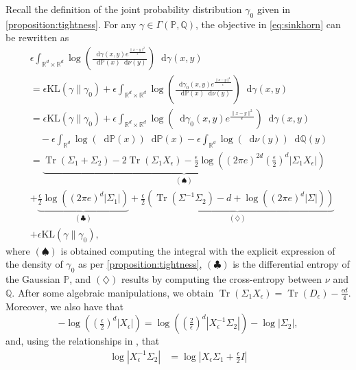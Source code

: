 \documentclass[letterpaper, 10 pt, conference]{ieeeconf}  %
\makeatletter
\renewenvironment{proof}[1][\proofname]{\par
  \pushQED{\qed}%
  \normalfont \topsep\z@
  \trivlist
  \item[\hskip2em
        \itshape
    #1\@addpunct{:}]\ignorespaces
}{%
  \popQED\endtrivlist\@endpefalse
}
\theoremstyle{ieeeconf}
\DeclareMathOperator{\Tr}{Tr}
\newcommand{\R}{\mathbb{R}}
\newcommand{\Prob}{\mathbb{P}}
\newcommand{\Q}{\mathbb{Q}}
\newcommand{\dd}{\mathop{}\!\mathrm{d}}
\makeatother
\begin{document}
\begin{proof}
Recall the definition of the joint probability distribution $\gamma_0$ given in \cref{proposition:tightness}. For any  $\gamma\in\Gamma(\Prob, \Q)$, the objective in \eqref{eq:sinkhorn} can be rewritten as
\begin{align*}
    &\epsilon\int_{\R^d\times\R^d}\log\left(\frac{\dd\gamma(x,y)e^{\frac{\|x-y\|^2}{\epsilon}}}{\dd\Prob(x)\dd\nu(y)}\right)\dd\gamma(x,y)
    \\
    &=\epsilon \mathrm{KL}(\gamma\|\gamma_0) + \epsilon\int_{\R^d\times\R^d}\log\left(\frac{\dd\gamma_0(x,y)e^{\frac{\|x-y\|^2}{\epsilon}}}{\dd\Prob(x)\dd\nu(y)}\right)\dd\gamma(x,y)
    \\
    &=\epsilon \mathrm{KL}(\gamma\|\gamma_0) + \epsilon\int_{\R^d\times\R^d}\log\left(\dd\gamma_0(x,y)e^{\frac{\|x-y\|^2}{\epsilon}}\right)\dd\gamma(x,y) 
    \\
    & \quad 
    - \epsilon\int_{\R^d}\log\left(\dd\Prob(x)\right)\dd\Prob(x) 
    - \epsilon\int_{\R^d}\log\left(\dd\nu(y)\right)\dd\Q(y)
    \\
    &=\underbrace{\Tr(\Sigma_1 + \Sigma_2)\! -\! 2\Tr(\Sigma_1X_\epsilon)
    \!-\! \tfrac{\epsilon}{2}\log\!\left((2\pi e)^{2d}\!\left(\tfrac{\epsilon}{2}\right)^d\!|\Sigma_1X_\epsilon|\right)}_{(\spadesuit)}
    \\
    &
    +\! \underbrace{\tfrac{\epsilon}{2}\log\!\left((2\pi e)^d|\Sigma_1|\right)}_{(\clubsuit)}
    \!+\! \underbrace{\tfrac{\epsilon}{2}\left(\Tr(\Sigma^{-1}\Sigma_2)\! -\! d
    \!+\! \log\!\left((2\pi e)^d|\Sigma|\right)\right)}_{(\diamondsuit)}
    \\
    &
    + \epsilon \mathrm{KL}(\gamma\|\gamma_0),
\end{align*}
where $(\spadesuit)$ is obtained computing the integral with the explicit expression of the density of $\gamma_0$ as per \cref{proposition:tightness}, $(\clubsuit)$ is the differential
entropy of the Gaussian $\Prob$, and $(\diamondsuit)$ results by computing the cross-entropy between $\nu$ and $\Q$. After some algebraic manipulations, we obtain $\Tr(\Sigma_1X_\epsilon) = \Tr(D_\epsilon) - \frac{\epsilon d}{4}$. Moreover, we also have that \[-\log\left(\left(\tfrac{\epsilon}{2}\right)^d|X_\epsilon|\right) = \log\left(\left(\tfrac{2}{\epsilon}\right)^d|X_\epsilon^{-1}\Sigma_2|\right) - \log|\Sigma_2|,\] and, using the relationships in \cite[Proposition 2.1]{del2020statistical}, that
\begin{align*}
  \log|X_\epsilon^{-1}\Sigma_2| &= \log|X_\epsilon\Sigma_1 + \tfrac{\epsilon}{2}I| 

\end{align*}
\end{proof}
\end{document}
